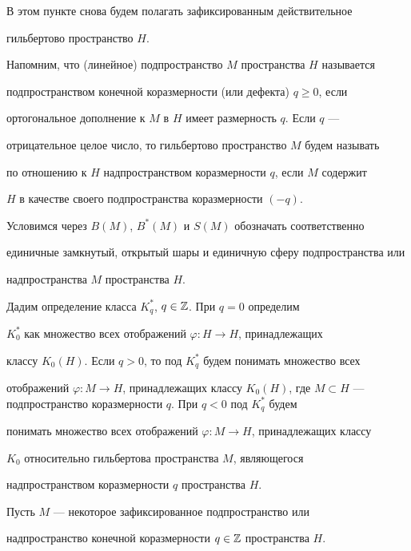  


В этом пункте снова будем полагать зафиксированным действительное 


гильбертово пространство $H$. 


 


Напомним, что (линейное) подпространство $M$ пространства $H$ называется 


подпространством конечной коразмерности (или дефекта) $q\ge0$, если 


ортогональное дополнение к $M$ в $H$ имеет размерность $q$. Если $q$ --- 


отрицательное целое число, то гильбертово пространство $M$ будем называть 


по отношению к $H$ надпространством коразмерности $q$, если $M$ содержит 


$H$ в качестве своего подпространства коразмерности $(-q)$. 


 


Условимся через $B(M)$, $B^*(M)$ и $S(M)$ обозначать соответственно 


единичные замкнутый, открытый шары и единичную сферу подпространства или 


надпространства $M$ пространства $H$. 


 


Дадим определение класса $K^*_q$, $q\in\Bbb Z$. При $q=0$ определим 


$K^*_0$ как множество всех отображений $\varphi:H\to H$, принадлежащих 


классу $K_0(H)$. Если $q>0$, то под $K^*_q$ будем понимать множество всех 


отображений $\varphi:M\to H$, принадлежащих классу $K_0(H)$, где $M\subset 


H$ --- подпространство коразмерности $q$. При $q<0$ под $K^*_q$ будем 


понимать множество всех отображений $\varphi:M\to H$, принадлежащих классу 


$K_0$ относительно гильбертова пространства $M$, являющегося 


надпространством коразмерности $q$ пространства $H$. 


 


Пусть $M$ --- некоторое зафиксированное подпространство или 


надпространство конечной коразмерности $q\in\Bbb Z$ пространства $H$. 


